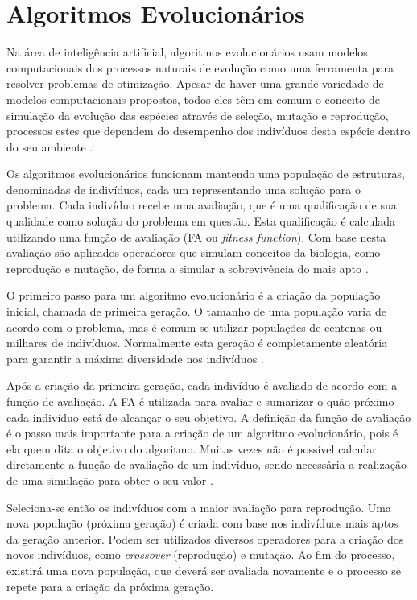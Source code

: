 \documentclass[12pt,oneside,a4paper,english,french,spanish,brazil,]{abntex2}
\begin{document}
\section{Algoritmos Evolucionários}

Na área de inteligência artificial, algoritmos evolucionários usam modelos computacionais dos processos naturais de evolução como uma ferramenta para resolver problemas de otimização. Apesar de haver uma grande variedade de modelos computacionais propostos, todos eles têm em comum o conceito de simulação da evolução das espécies através de seleção, mutação e reprodução, processos estes que dependem do desempenho dos indivíduos desta espécie dentro do seu ambiente \cite{linden:2008}.

Os algoritmos evolucionários funcionam mantendo uma população de estruturas, denominadas de indivíduos, cada um representando uma solução para o problema. Cada indivíduo recebe uma avaliação, que é uma qualificação de sua qualidade como solução do problema em questão. Esta qualificação é calculada utilizando uma função de avaliação (FA ou \textit{fitness function}). Com base nesta avaliação são aplicados operadores que simulam conceitos da biologia, como reprodução e mutação, de forma a simular a sobrevivência do mais apto \cite{linden:2008}.

O primeiro passo para um algoritmo evolucionário é a criação da população inicial, chamada de primeira geração. O tamanho de uma população varia de acordo com o problema, mas é comum se utilizar populações de centenas ou milhares de indivíduos. Normalmente esta geração é completamente aleatória para garantir a máxima diversidade nos indivíduos \cite{linden:2008}.

Após a criação da primeira geração, cada indivíduo é avaliado de acordo com a função de avaliação. A FA é utilizada para avaliar e sumarizar o quão próximo cada indivíduo está de alcançar o seu objetivo. A definição da função de avaliação é o passo mais importante para a criação de um algoritmo evolucionário, pois é ela quem dita o objetivo do algoritmo. Muitas vezes não é possível calcular diretamente a função de avaliação de um indivíduo, sendo necessária a realização de uma simulação para obter o seu valor \cite{linden:2008}.

Seleciona-se então os indivíduos com a maior avaliação para reprodução. Uma nova população (próxima geração) é criada com base nos indivíduos mais aptos da geração anterior. Podem ser utilizados diversos operadores para a criação dos novos indivíduos, como \textit{crossover} (reprodução) e mutação. Ao fim do processo, existirá uma nova população, que deverá ser avaliada novamente e o processo se repete para a criação da próxima geração.
\end{document}
